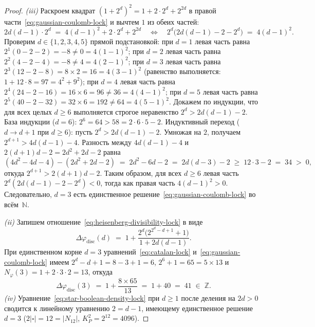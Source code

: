 \begin{proof}
\emph{(iii)} Раскроем квадрат $(1+2^d)^2 = 1 + 2\cdot 2^d + 2^{2d}$ в правой части~\eqref{eq:gaussian-coulomb-lock} и вычтем $1$ из обеих частей:
\[
  2d(d-1)\cdot 2^d \;=\; 4(d-1)^2 + 2\cdot 2^d + 2^{2d}
  \quad\Longleftrightarrow\quad
  2^d\bigl(2d(d-1) - 2 - 2^d\bigr) \;=\; 4(d-1)^2.
\]
Проверим $d\in\{1,2,3,4,5\}$ прямой подстановкой:
при $d=1$ левая часть равна $2^1(0-2-2) = -8 \ne 0 = 4(1-1)^2$;
при $d=2$ левая часть равна $2^2(4-2-4) = -8 \ne 4 = 4(2-1)^2$;
при $d=3$ левая часть равна $2^3(12-2-8) = 8\times 2 = 16 = 4(3-1)^2$ (равенство выполняется: $1+12\cdot 8 = 97 = 4^2+9^2$);
при $d=4$ левая часть равна $2^4(24-2-16) = 16\times 6 = 96 \ne 36 = 4(4-1)^2$;
при $d=5$ левая часть равна $2^5(40-2-32) = 32\times 6 = 192 \ne 64 = 4(5-1)^2$.
Докажем по индукции, что для всех целых $d\ge 6$ выполняется строгое неравенство $2^d > 2d(d-1) - 2$.
База индукции ($d=6$): $2^6 = 64 > 58 = 2\cdot 6\cdot 5 - 2$.
Индуктивный переход ($d\to d+1$ при $d\ge 6$): пусть $2^d > 2d(d-1) - 2$. Умножая на $2$, получаем $2^{d+1} > 4d(d-1) - 4$.
Разность между $4d(d-1) - 4$ и $2(d+1)d - 2 = 2d^2 + 2d - 2$ равна
\[
  (4d^2 - 4d - 4) - (2d^2 + 2d - 2) \;=\; 2d^2 - 6d - 2 \;=\; 2d(d-3) - 2 \;\ge\; 12\cdot 3 - 2 \;=\; 34 \;>\; 0,
\]
откуда $2^{d+1} > 2(d+1)d - 2$. Таким образом, для всех $d\ge 6$ левая часть $2^d(2d(d-1)-2-2^d) < 0$, тогда как правая часть $4(d-1)^2 > 0$.
Следовательно, $d=3$ есть единственное решение~\eqref{eq:gaussian-coulomb-lock} во всём~$\mathbb{N}$.

\emph{(ii)} Запишем отношение~\eqref{eq:heisenberg-divisibility-lock} в виде
\[
  \Delta\varphi_{\mathrm{disc}}(d) \;=\; 1 + \frac{2^d\bigl(2^{2^d - d + 1} + 1\bigr)}{1 + 2d(d-1)}.
\]
При единственном корне $d=3$ уравнений~\eqref{eq:catalan-lock} и~\eqref{eq:gaussian-coulomb-lock} имеем $2^d - d + 1 = 8 - 3 + 1 = 6$,
$2^6 + 1 = 65 = 5\times 13$ и $N_\varphi(3) = 1 + 2\cdot 3\cdot 2 = 13$, откуда
\[
  \Delta\varphi_{\mathrm{disc}}(3) \;=\; 1 + \frac{8\times 65}{13} \;=\; 1 + 40 \;=\; 41 \;\in\; \mathbb{Z}.
\]
\emph{(iv)} Уравнение~\eqref{eq:star-boolean-density-lock} при $d\ge 1$ после деления на $2d>0$ сводится к линейному уравнению $2 = d-1$, имеющему единственное решение $d=3$ ($2|\square|=12=|N_{12}|$, $K_P^2 = 2^{12} = 4096$).


\end{proof}
